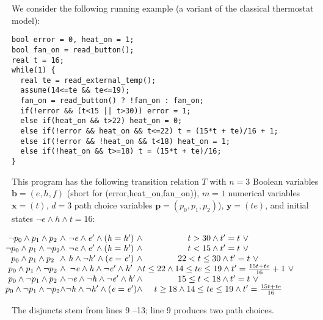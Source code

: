 \documentclass{llncs}
\renewcommand{\vec}[1]{{\boldsymbol #1}}
\newcommand{\verr}{\mathit{e}} \newcommand{\vheat}{\mathit{h}} \newcommand{\vfan}{\mathit{f}}
\begin{document}
\begin{example*}
We consider the following running example (a variant of the classical
thermostat model):

\lstset{numbers=left, numberstyle=\tiny, stepnumber=1, numbersep=5pt}
{\footnotesize
\begin{lstlisting}
bool error = 0, heat_on = 1;
bool fan_on = read_button();
real t = 16;
while(1) {
  real te = read_external_temp();
  assume(14<=te && te<=19);
  fan_on = read_button() ? !fan_on : fan_on;
  if(!error && (t<15 || t>30)) error = 1;
  else if(heat_on && t>22) heat_on = 0;
  else if(!error && heat_on && t<=22) t = (15*t + te)/16 + 1;
  else if(!error && !heat_on && t<18) heat_on = 1; 
  else if(!heat_on && t>=18) t = (15*t + te)/16;
}
\end{lstlisting}}
This program has the following transition relation $T$ with $n=3$
Boolean variables $\vec{b}=(\verr,\vheat,\vfan)$ (short for (error,heat\_on,fan\_on)),
$m=1$ numerical variables $\vec{x}=(t)$, $d=3$ path choice variables
$\vec{p}=(p_0,p_1,p_2)$), $\vec{y}=(te)$, and initial states $\neg \verr \wedge
\vheat \wedge t=16$:

\smallskip
{\small
$
\hspace*{-3ex}\begin{array}{c@{}c@{}c@{}c@{}c}
  \neg p_0 \wedge p_1 \wedge p_2 
  &\wedge&
  \neg \verr \wedge \verr' \wedge (\vheat=\vheat')
  &\wedge&
  t>30 \wedge t' = t~\vee\\

  \neg p_0 \wedge p_1 \wedge \neg p_2 
  &\wedge&
  \neg \verr \wedge \verr' \wedge (\vheat=\vheat')
  &\wedge&
  t<15 \wedge t' = t~\vee \\

  p_0 \wedge p_1 \wedge p_2
  &\wedge&
  \vheat \wedge \neg \vheat' \wedge (\verr=\verr')
  &\wedge&
  22<t\leq 30 \wedge t' = t~\vee \\

  p_0 \wedge p_1 \wedge \neg p_2
  &\wedge&
  \neg \verr \wedge \vheat \wedge \neg \verr' \wedge  \vheat' 
  &\wedge&
  t\leq 22 \wedge 14\leq te\leq 19 \wedge t' =
  \frac{15t+te}{16}+1~\vee \\
 
  p_0 \wedge \neg p_1 \wedge p_2
  &\wedge&
  \neg \verr \wedge \neg \vheat \wedge \neg \verr' \wedge \vheat'   
  &\wedge&
  15\leq t<18 \wedge t' = t~\vee \\

  p_0 \wedge \neg p_1 \wedge \neg p_2
  &\wedge&
  \neg \vheat \wedge \neg \vheat' \wedge  (\verr=\verr')
  &\wedge&
  t\geq 18 \wedge 14\leq te\leq 19 \wedge t' = \frac{15t+te}{16} 
\end{array}
$
}

\smallskip
\noindent The disjuncts stem from lines 9 --13; line 9 produces two
path choices. 
\end{example*}
\end{document}
